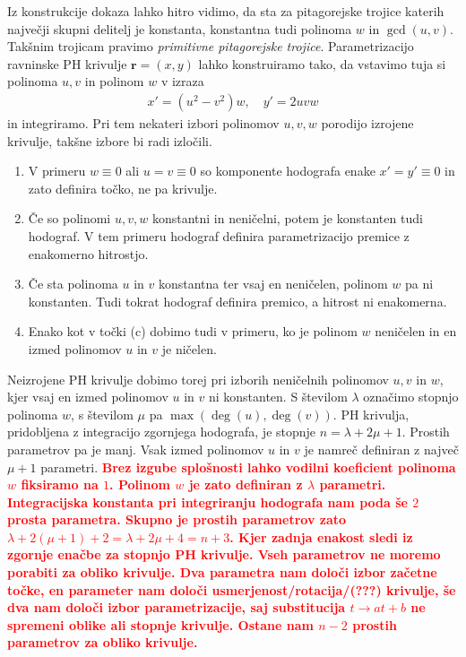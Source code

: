 \documentclass[isrm2, tisk]{fmfdelo}
\newcommand{\mycomment}[1]{\textbf{\textcolor{red}{#1}}}
\begin{document}
    \noindent Iz konstrukcije dokaza lahko hitro vidimo, da sta za pitagorejske trojice katerih največji skupni delitelj je konstanta, konstantna tudi polinoma $w$ in $\gcd(u,v)$.
    Takšnim trojicam pravimo \textit{primitivne pitagorejske trojice}.
    Parametrizacijo ravninske PH krivulje $\mathbf{r}=(x,y)$ lahko konstruiramo tako, da vstavimo tuja si polinoma $u,v$ in polinom $w$ v izraza
    \begin{align}
        x'=(u^2-v^2)w,\quad y'=2uvw  \label{eq:hodograf-splosni}
    \end{align} in integriramo.
    Pri tem nekateri izbori polinomov $u,v,w$ porodijo izrojene krivulje, takšne izbore bi radi izločili.
    \begin{enumerate}
        \itemsep0em
        \item V primeru $w\equiv 0$ ali $u=v \equiv 0$ so komponente hodografa enake $x'=y'\equiv 0$ in zato definira točko, ne pa krivulje.
        \item  Če so polinomi $u,v,w$ konstantni in neničelni, potem je konstanten tudi hodograf.
        V tem primeru hodograf definira parametrizacijo premice z enakomerno hitrostjo.
        \item  Če sta polinoma $u$ in $v$ konstantna ter vsaj en neničelen, polinom $w$ pa ni konstanten.
        Tudi tokrat hodograf definira premico, a hitrost ni enakomerna.
        \item Enako kot v točki (c) dobimo tudi v primeru, ko je polinom $w$ neničelen in en izmed polinomov $u$ in $v$ je ničelen.
    \end{enumerate}
    \vspace{-0.3cm}
    \noindent Neizrojene PH krivulje dobimo torej pri izborih neničelnih polinomov $u,v$ in $w$, kjer vsaj en izmed polinomov $u$ in $v$ ni konstanten.
    S številom $\lambda$ označimo stopnjo polinoma $w$, s številom $\mu$ pa $\max(\deg(u),\deg(v))$.
    PH krivulja, pridobljena z integracijo zgornjega hodografa, je stopnje $n=\lambda + 2\mu + 1$.
    Prostih parametrov pa je manj.
    Vsak izmed polinomov $u$ in $v$ je namreč definiran z največ $\mu + 1$ parametri.
    \mycomment{
        Brez izgube splošnosti lahko vodilni koeficient polinoma $w$ fiksiramo na $1$.
        Polinom $w$ je zato definiran z $\lambda$ parametri.
        Integracijska konstanta pri integriranju hodografa nam poda še $2$ prosta parametra.
        Skupno je prostih parametrov zato $\lambda + 2(\mu+1)+2=\lambda + 2\mu+4 = n+3$.
        Kjer zadnja enakost sledi iz zgornje enačbe za stopnjo PH krivulje.
        Vseh parametrov ne moremo porabiti za obliko krivulje.
        Dva parametra nam določi izbor začetne točke, en parameter nam določi usmerjenost/rotacija/(???) krivulje, še dva nam določi izbor parametrizacije, saj substitucija $t\to at+b$ ne spremeni oblike ali stopnje krivulje.
        Ostane nam $n-2$ prostih parametrov za obliko krivulje.}
\end{document}
